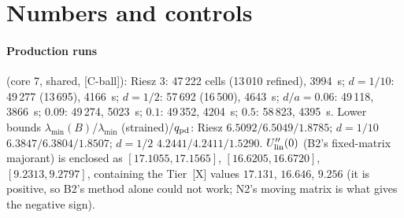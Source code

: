 \documentclass[11pt]{article}
\newcommand{\tier}[1]{\textsf{[#1]}}
\newcommand{\tCb}{\tier{C-ball}}
\newcommand{\tX}{\tier{X}}
\begin{document}
\section{Numbers and controls}\label{sec:controls}
\paragraph{Production runs} (core 7, shared, \tCb): Riesz 3: 47\,222 cells (13\,010 refined), 3994~s; $d=1/10$: 49\,277 (13\,695), 4166~s; $d=1/2$: 57\,692 (16\,500), 4643~s; $d/a=0.06$: 49\,118, 3866~s; $0.09$: 49\,274, 5023~s; $0.1$: 49\,352, 4204~s; $0.5$: 58\,823, 4395~s. Lower bounds $\lambda_{\min}(B)$/$\lambda_{\min}$ (strained)/$q_{\rm pd}$: Riesz $6.5092/6.5049/1.8785$; $d=1/10$ $6.3847/6.3804/1.8507$; $d=1/2$ $4.2441/4.2411/1.5290$. $U_{\rm lin}''(0)$ (B2's fixed-matrix majorant) is enclosed as $[17.1055,17.1565]$, $[16.6205,16.6720]$, $[9.2313,9.2797]$, containing the Tier~\tX{} values $17.131$, $16.646$, $9.256$ (it is positive, so B2's method alone could not work; N2's moving matrix is what gives the negative sign).
\end{document}

